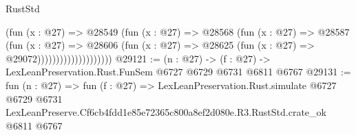 \begin{lexlean}{RustStd}
\begin{coremodule}
                                (fun (x : @27) =>
                                @28549
                                  (fun (x : @27) =>
                                  @28568
                                    (fun (x : @27) =>
                                    @28587
                                      (fun (x : @27) =>
                                      @28606
                                        (fun (x : @27) =>
                                        @28625 (fun (x : @27) => @29072))))))))))))))))))))
@29121 := (n : @27) -> (f : @27) -> LexLeanPreservation.Rust.FunSem @6727 @6729 @6731 @6811 @6767
@29131 := fun (n : @27) =>
  fun (f : @27) =>
  LexLeanPreservation.Rust.simulate
    @6727
    @6729
    @6731
    LexLeanPreserve.Cf6cb4fdd1e85e72365c800a8ef2d080e.R3.RustStd.crate_ok
    @6811
    @6767
\end{coremodule}
\end{lexlean}
